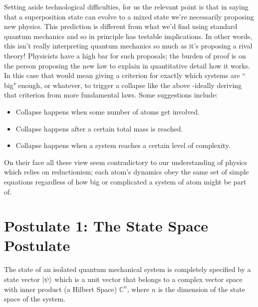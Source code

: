 Setting aside technological difficulties, for us the relevant point is that in saying that a superposition state can evolve to a mixed state we're necessarily proposing new physics. This prediction is different from what we'd find using standard quantum mechanics and so in principle has testable implications. In other words, this isn't really interpreting quantum mechanics so much as it's proposing a rival theory! Physicists have a high bar for such proposals; the burden of proof is on the person proposing the new law to explain in quantitative detail how it works. In this case that would mean giving a criterion for exactly which systems are `` big" enough, or whatever, to trigger a collapse like the above -ideally deriving that criterion from more fundamental laws. Some suggestions include:
\begin{itemize}
    \item Collapse happens when some number of atoms get involved.
    \item Collapse happens after a certain total mass is reached.
    \item Collapse happens when a system reaches a certain level of complexity.
\end{itemize}
On their face all these view seem contradictory to our understanding of physics which relies on reductionism; each atom's dynamics obey the same set of simple equations regardless of how big or complicated a system of atom might be part of.
\section{Postulate 1: The State Space Postulate}
The state of an isolated quantum mechanical system is completely specified by a state vector $\ket{\psi}$ 
which is a unit vector that belongs to a complex vector space with inner product (a Hilbert Space) $\mathbb{C}^{n}$, where $n$ is the 
dimension of the state space of the system. 

